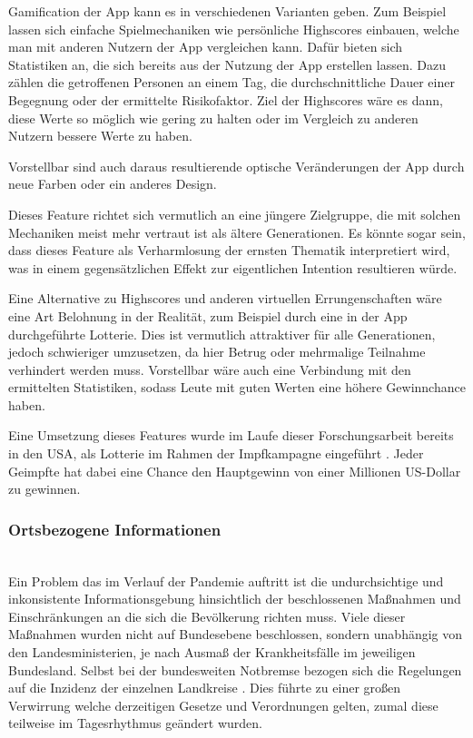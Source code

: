 \documentclass[conference,compsoc]{IEEEtran}
\begin{document}
Gamification der App kann es in verschiedenen Varianten geben. 
Zum Beispiel lassen sich einfache Spielmechaniken wie persönliche Highscores einbauen, welche man mit anderen Nutzern der App vergleichen kann. 
Dafür bieten sich Statistiken an, die sich bereits aus der Nutzung der App erstellen lassen. 
Dazu zählen die getroffenen Personen an einem Tag, die durchschnittliche Dauer einer Begegnung oder der ermittelte Risikofaktor. 
Ziel der Highscores wäre es dann, diese Werte so möglich wie gering zu halten oder im Vergleich zu anderen Nutzern bessere Werte zu haben.

Vorstellbar sind auch daraus resultierende optische Veränderungen der App durch neue Farben oder ein anderes Design.

Dieses Feature richtet sich vermutlich an eine jüngere Zielgruppe, die mit solchen Mechaniken meist mehr vertraut ist als ältere Generationen.
Es könnte sogar sein, dass dieses Feature als Verharmlosung der ernsten Thematik interpretiert wird, was in einem gegensätzlichen Effekt zur eigentlichen Intention resultieren würde.

Eine Alternative zu Highscores und anderen virtuellen Errungenschaften wäre eine Art Belohnung in der Realität, zum Beispiel durch eine in der App durchgeführte Lotterie.
Dies ist vermutlich attraktiver für alle Generationen, jedoch schwieriger umzusetzen, da hier Betrug oder mehrmalige Teilnahme verhindert werden muss. 
Vorstellbar wäre auch eine Verbindung mit den ermittelten Statistiken, sodass Leute mit guten Werten eine höhere Gewinnchance haben.

Eine Umsetzung dieses Features wurde im Laufe dieser Forschungsarbeit bereits in den USA, als Lotterie im Rahmen der Impfkampagne eingeführt \cite{Lotto}.
Jeder Geimpfte hat dabei eine Chance den Hauptgewinn von einer Millionen US-Dollar zu gewinnen.\\

\subsubsection{Ortsbezogene Informationen}
\text{}\\
Ein Problem das im Verlauf der Pandemie auftritt ist die undurchsichtige und inkonsistente Informationsgebung 
hinsichtlich der beschlossenen Maßnahmen und Einschränkungen an die sich die Bevölkerung richten muss. 
Viele dieser Maßnahmen wurden nicht auf Bundesebene beschlossen, sondern unabhängig von den Landesministerien, je nach Ausmaß der Krankheitsfälle im jeweiligen Bundesland.
Selbst bei der bundesweiten Notbremse bezogen sich die Regelungen auf die Inzidenz der einzelnen Landkreise \cite{Notbremse}.
Dies führte zu einer großen Verwirrung welche derzeitigen Gesetze und Verordnungen gelten, zumal diese teilweise im Tagesrhythmus geändert wurden.
\end{document}
